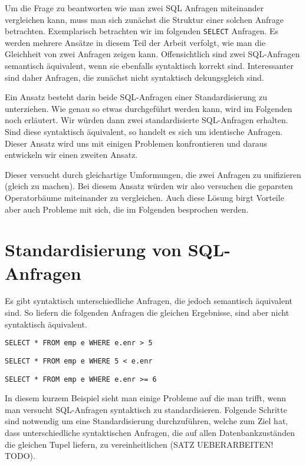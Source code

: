 Um die Frage zu beantworten wie man zwei SQL Anfragen miteinander vergleichen kann, muss man sich zunächst die Struktur einer solchen Anfrage betrachten. Exemplarisch betrachten wir im folgenden \verb|SELECT| Anfragen. Es werden mehrere Ansätze in diesem Teil der Arbeit verfolgt, wie man die Gleichheit von zwei Anfragen zeigen kann. Offensichtlich sind zwei SQL-Anfragen semantisch äquivalent, wenn sie ebenfalls syntaktisch korrekt sind. Interessanter sind daher Anfragen, die zunächst nicht syntaktisch dekungsgleich sind. 

Ein Ansatz besteht darin beide SQL-Anfragen einer Standardisierung zu unterziehen. Wie genau so etwas durchgeführt werden kann, wird im Folgenden noch erläutert. Wir würden dann zwei standardisierte SQL-Anfragen erhalten. Sind diese syntaktisch äquivalent, so handelt es sich um identische Anfragen. Dieser Ansatz wird uns mit einigen Problemen konfrontieren und daraus entwickeln wir einen zweiten Ansatz. 

Dieser versucht durch gleichartige Umformungen, die zwei Anfragen zu unifizieren (gleich zu machen). Bei diesem Ansatz würden wir also versuchen die geparsten Operatorbäume miteinander zu vergleichen. Auch diese Lösung birgt Vorteile aber auch Probleme mit sich, die im Folgenden besprochen werden.

\section{Standardisierung von SQL-Anfragen}

Es gibt syntaktisch unterschiedliche Anfragen, die jedoch semantisch äquivalent sind. So liefern die folgenden Anfragen die gleichen Ergebnisse, sind aber nicht syntaktisch äquivalent.

\begin{verbatim}
SELECT * FROM emp e WHERE e.enr > 5
\end{verbatim}

\begin{verbatim}
SELECT * FROM emp e WHERE 5 < e.enr
\end{verbatim}

\begin{verbatim}
SELECT * FROM emp e WHERE e.enr >= 6
\end{verbatim}

In diesem kurzem Beispiel sieht man einige Probleme auf die man trifft, wenn man versucht SQL-Anfragen syntaktisch zu standardisieren. Folgende Schritte sind notwendig um eine Standardisierung durchzuführen, welche zum Ziel hat, dass unterschiedliche syntaktischen Anfragen, die auf allen Datenbankzuständen die gleichen Tupel liefern, zu vereinheitlichen (SATZ UEBERARBEITEN! TODO).

